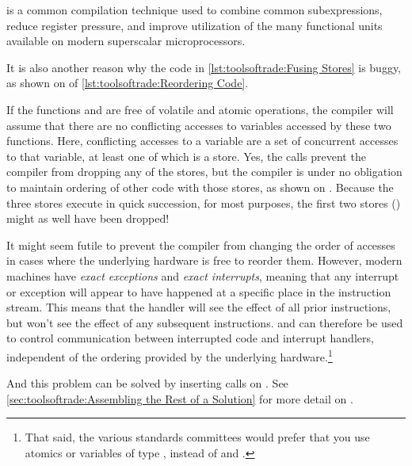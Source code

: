 \begin{description}[labelsep=.4em]
\item[Code reordering] is a common compilation technique used to
combine common subexpressions, reduce register pressure, and
improve utilization of the many functional units available on
modern superscalar microprocessors.
\begin{fcvref}
It is also another reason why the code in
\cref{lst:toolsoftrade:Fusing Stores}
is buggy, as shown on  of
\cref{lst:toolsoftrade:Reordering Code}.

If the functions  and  are free
of volatile and atomic operations, the compiler will assume that there
are no conflicting accesses to variables accessed by these two functions.
Here, conflicting accesses to a variable are a set of concurrent accesses
to that variable, at least one of which is a store.
Yes, the  calls prevent the compiler from dropping
any of the stores, but the compiler is under no obligation to maintain
ordering of other code with those stores, as shown on .
Because the three stores execute in quick succession, for most purposes,
the first two stores () might as well have been dropped!

It might seem futile to prevent the compiler from changing the order of
accesses in cases where the underlying hardware is free to reorder them.
However, modern machines have \emph{exact exceptions} and
\emph{exact interrupts}, meaning that any interrupt or exception will
appear to have happened at a specific place in the instruction
stream.
This means that the handler will see the effect of all prior
instructions, but won't see the effect of any subsequent instructions.
 and  can therefore be used to
control communication between interrupted code and interrupt handlers,
independent of the ordering provided by the underlying hardware.\footnote{
	That said, the various standards committees would prefer that
	you use atomics or variables of type , instead
	of  and .}

And this problem can be solved by inserting 
calls on .
See
\cref{sec:toolsoftrade:Assembling the Rest of a Solution}
for more detail on .
\end{fcvref}

\end{description}
